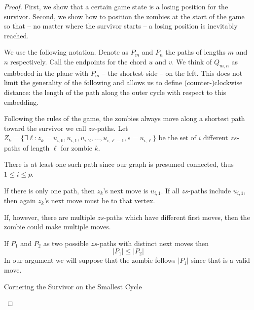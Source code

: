 \documentclass[letterpaper, 10pt]{article}
\begin{document}
\begin{proof}
First, we show that a certain game state is a losing position for the survivor.
Second, we show how to position the zombies at the start of the game so that --
no matter where the survivor starts -- a losing position is inevitably reached.

We use the following notation.
Denote as $P_m$ and $P_n$ the paths of lengths $m$ and $n$ respectively.
Call the endpoints for the chord $u$ and $v$.
We think of $Q_{m,n}$ as embbeded in the plane with $P_m$
-- the shortest side -- on the left.
This does not limit the generality of the following and allows us to define (counter-)clockwise distance: the length of the path
along the outer cycle with respect to this embedding.

Following the rules of the game, the zombies always move along a shortest path toward the survivor we call $zs$-paths. Let
$Z_k = \{  \exists \ell : z_k = u_{i,0}, u_{i, 1}, u_{i, 2}, \dots, u_{i, \ell-1}, s= u_{i, \ell}\}$ be the set of $i$ different $zs$-paths of length $\ell$ for zombie $k$.

There is at least one such path since our graph is presumed connected,
thus $1 \leq i \leq p$.

If there is only one path, then $z_k$'s next move is $u_{i, 1}$. If all $zs$-paths
include $u_{i,1}$, then again $z_k$'s next move must be to that vertex.

If, however, there are multiple $zs$-paths which have different first moves,
then the zombie could make multiple moves.

If $P_1$ and $P_2$ as two possible $zs$-paths with distinct next moves then
\[ |P_1| \leq |P_2| \]
In our argument we will suppose that the zombie follows $|P_1|$ since that
is a valid move.

\begin{proofpart} Cornering the Survivor on the Smallest Cycle


\end{proofpart}
\end{proof}
\end{document}
